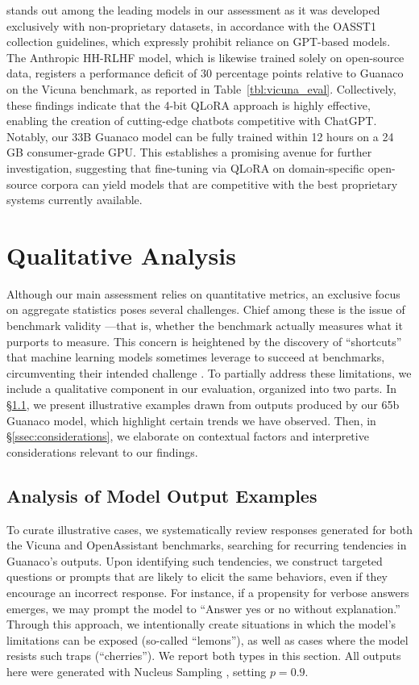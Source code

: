  stands out among the leading models in our assessment as it was developed exclusively with non-proprietary datasets, in accordance with the OASST1 collection guidelines, which expressly prohibit reliance on GPT-based models. The Anthropic HH-RLHF model, which is likewise trained solely on open-source data, registers a performance deficit of 30 percentage points relative to {Guanaco} on the Vicuna benchmark, as reported in Table~\ref{tbl:vicuna_eval}. Collectively, these findings indicate that the 4-bit \textsc{QLoRA} approach is highly effective, enabling the creation of cutting-edge chatbots competitive with ChatGPT. Notably, our 33B {Guanaco} model can be fully trained within 12 hours on a 24 GB consumer-grade GPU. This establishes a promising avenue for further investigation, suggesting that fine-tuning via \textsc{QLoRA} on domain-specific open-source corpora can yield models that are competitive with the best proprietary systems currently available.

\section{Qualitative Analysis}

Although our main assessment relies on quantitative metrics, an exclusive focus on aggregate statistics poses several challenges. Chief among these is the issue of benchmark validity \citep{liao2021we}—that is, whether the benchmark actually measures what it purports to measure. This concern is heightened by the discovery of ``shortcuts'' that machine learning models sometimes leverage to succeed at benchmarks, circumventing their intended challenge \citep{gururangan2018annotation, poliak2018hypothesis}. To partially address these limitations, we include a qualitative component in our evaluation, organized into two parts. In \S\ref{ssec:examples}, we present illustrative examples drawn from outputs produced by our 65b {Guanaco} model, which highlight certain trends we have observed. Then, in \S\ref{ssec:considerations}, we elaborate on contextual factors and interpretive considerations relevant to our findings.

\subsection{Analysis of Model Output Examples}
\label{ssec:examples}

To curate illustrative cases, we systematically review responses generated for both the Vicuna and OpenAssistant benchmarks, searching for recurring tendencies in {Guanaco}'s outputs. Upon identifying such tendencies, we construct targeted questions or prompts that are likely to elicit the same behaviors, even if they encourage an incorrect response. For instance, if a propensity for verbose answers emerges, we may prompt the model to ``Answer yes or no without explanation.'' Through this approach, we intentionally create situations in which the model's limitations can be exposed (so-called ``lemons''), as well as cases where the model resists such traps (``cherries''). We report both types in this section. All outputs here were generated with Nucleus Sampling \cite{holtzmancurious}, setting $p=0.9$.

